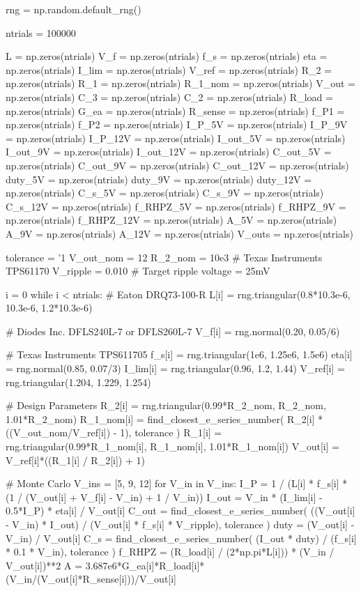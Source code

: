 \documentclass[12pt, titlepage]{/home/air/projects/latex-template/tex-template}
\begin{document}
\begin{pycode}
rng = np.random.default_rng()

ntrials = 100000

L = np.zeros(ntrials)
V_f = np.zeros(ntrials)
f_s = np.zeros(ntrials)
eta = np.zeros(ntrials)
I_lim = np.zeros(ntrials)
V_ref = np.zeros(ntrials)
R_2 = np.zeros(ntrials)
R_1 = np.zeros(ntrials)
R_1_nom = np.zeros(ntrials)
V_out = np.zeros(ntrials)
C_3 = np.zeros(ntrials)
C_2 = np.zeros(ntrials)
R_load = np.zeros(ntrials)
G_ea = np.zeros(ntrials)
R_sense = np.zeros(ntrials)
f_P1 = np.zeros(ntrials)
f_P2 = np.zeros(ntrials)
I_P_5V = np.zeros(ntrials)
I_P_9V = np.zeros(ntrials)
I_P_12V = np.zeros(ntrials)
I_out_5V = np.zeros(ntrials)
I_out_9V = np.zeros(ntrials)
I_out_12V = np.zeros(ntrials)
C_out_5V = np.zeros(ntrials)
C_out_9V = np.zeros(ntrials)
C_out_12V = np.zeros(ntrials)
duty_5V = np.zeros(ntrials)
duty_9V = np.zeros(ntrials)
duty_12V = np.zeros(ntrials)
C_s_5V = np.zeros(ntrials)
C_s_9V = np.zeros(ntrials)
C_s_12V = np.zeros(ntrials)
f_RHPZ_5V = np.zeros(ntrials)
f_RHPZ_9V = np.zeros(ntrials)
f_RHPZ_12V = np.zeros(ntrials)
A_5V = np.zeros(ntrials)
A_9V = np.zeros(ntrials)
A_12V = np.zeros(ntrials)
V_outs = np.zeros(ntrials)

tolerance = '1%
V_out_nom = 12
R_2_nom = 10e3  # Texas Instruments TPS61170
V_ripple = 0.010  # Target ripple voltage = 25mV

i = 0
while i < ntrials:
    # Eaton DRQ73-100-R
    L[i] = rng.triangular(0.8*10.3e-6, 10.3e-6, 1.2*10.3e-6)

    # Diodes Inc. DFLS240L-7 or DFLS260L-7
    V_f[i] = rng.normal(0.20, 0.05/6)

    # Texas Instruments TPS611705
    f_s[i] = rng.triangular(1e6, 1.25e6, 1.5e6)
    eta[i] = rng.normal(0.85, 0.07/3)
    I_lim[i] = rng.triangular(0.96, 1.2, 1.44)
    V_ref[i] = rng.triangular(1.204, 1.229, 1.254)

    # Design Parameters
    R_2[i] = rng.triangular(0.99*R_2_nom, R_2_nom, 1.01*R_2_nom)
    R_1_nom[i] = find_closest_e_series_number(
        R_2[i] * ((V_out_nom/V_ref[i]) - 1),
        tolerance
        )
    R_1[i] = rng.triangular(0.99*R_1_nom[i], R_1_nom[i], 1.01*R_1_nom[i])
    V_out[i] = V_ref[i]*((R_1[i] / R_2[i]) + 1)

    # Monte Carlo
    V_ins = [5, 9, 12]
    for V_in in V_ins:
        I_P = 1 / (L[i] * f_s[i] * (1 / (V_out[i] + V_f[i] - V_in) + 1 / V_in))
        I_out = V_in * (I_lim[i] - 0.5*I_P) * eta[i] / V_out[i]
        C_out = find_closest_e_series_number(
            ((V_out[i] - V_in) * I_out) / (V_out[i] * f_s[i] * V_ripple),
            tolerance
            )
        duty = (V_out[i] - V_in) / V_out[i]
        C_s = find_closest_e_series_number(
            (I_out * duty) / (f_s[i] * 0.1 * V_in),
            tolerance
            )
        f_RHPZ = (R_load[i] / (2*np.pi*L[i])) * (V_in / V_out[i])**2
        A = 3.687e6*G_ea[i]*R_load[i]*(V_in/(V_out[i]*R_sense[i]))/V_out[i]


\end{pycode}
\end{document}
